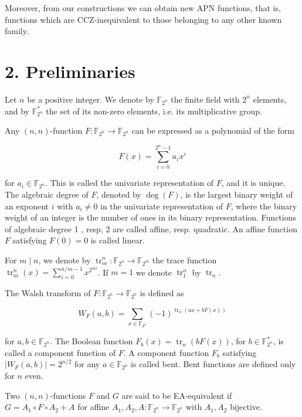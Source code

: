 \documentclass[10pt]{article}
\begin{document}
Moreover, from our constructions we can obtain new APN functions, that is, functions which are CCZ-inequivalent to those belonging to any other known family.

\section*{2. Preliminaries}
Let $n$ be a positive integer. We denote by $\mathbb{F}_{2^{n}}$ the finite field with $2^{n}$ elements, and by $\mathbb{F}_{2^{n}}^{*}$ the set of its non-zero elements, i.e. its multiplicative group.

Any $(n, n)$-function $F: \mathbb{F}_{2^{n}} \rightarrow \mathbb{F}_{2^{n}}$ can be expressed as a polynomial of the form

$$
F(x)=\sum_{i=0}^{2^{n}-1} a_{i} x^{i}
$$

for $a_{i} \in \mathbb{F}_{2^{n}}$. This is called the univariate representation of $F$, and it is unique.\\
The algebraic degree of $F$, denoted by $\operatorname{deg}(F)$, is the largest binary weight of an exponent $i$ with $a_{i} \neq 0$ in the univariate representation of $F$, where the binary weight of an integer is the number of ones in its binary representation. Functions of algebraic degree 1 , resp, 2 are called affine, resp. quadratic. An affine function $F$ satisfying $F(0)=0$ is called linear.

For $m \mid n$, we denote by $\operatorname{tr}_{m}^{n}: \mathbb{F}_{2^{n}} \rightarrow \mathbb{F}_{2^{m}}$ the trace function $\operatorname{tr}_{m}^{n}(x)=\sum_{i=0}^{n / m-1} x^{2^{m i}}$. If $m=1$ we denote $\operatorname{tr}_{1}^{n}$ by $\operatorname{tr}_{n}$.

The Walsh transform of $F: \mathbb{F}_{2^{n}} \rightarrow \mathbb{F}_{2^{n}}$ is defined as

$$
W_{F}(a, b)=\sum_{x \in \mathbb{F}_{2^{n}}}(-1)^{\operatorname{tr}_{n}(a x+b F(x))}
$$

for $a, b \in \mathbb{F}_{2^{n}}$. The Boolean function $F_{b}(x)=\operatorname{tr}_{n}(b F(x))$, for $b \in \mathbb{F}_{2^{n}}^{*}$, is called a component function of $F$. A component function $F_{b}$ satisfying $\left|W_{F}(a, b)\right|=2^{n / 2}$ for any $a \in \mathbb{F}_{2^{n}}$ is called bent. Bent functions are defined only for $n$ even.

Two $(n, n)$-functions $F$ and $G$ are said to be EA-equivalent if $G=A_{1} \circ F \circ A_{2}+A$ for affine $A_{1}, A_{2}, A: \mathbb{F}_{2^{n}} \rightarrow \mathbb{F}_{2^{n}}$ with $A_{1}, A_{2}$ bijective.
\end{document}
